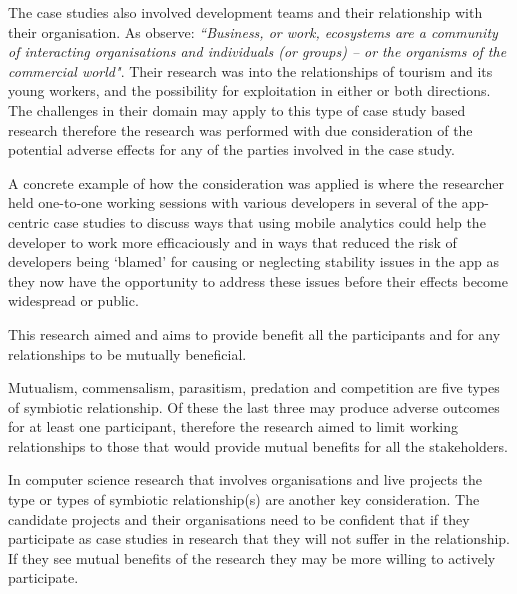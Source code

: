 The case studies also involved development teams and their relationship with their organisation. 
As \citet[p.2]{robinson2019_applying_endosymbiosis_theory_tourism_and_its_young_workers} observe: \emph{``Business, or work, ecosystems are a community of interacting organisations and individuals (or groups) – or the organisms of the commercial world"}. Their research was into the relationships of tourism and its young workers, and the possibility for exploitation in either or both directions. The challenges in their domain may apply to this type of case study based research therefore the research was performed with due consideration of the potential adverse effects for any of the parties involved in the case study. 

A concrete example of how the consideration was applied is where the researcher held one-to-one working sessions with various developers in several of the app-centric case studies to discuss ways that using mobile analytics could help the developer to work more efficaciously and in ways that reduced the risk of developers being `blamed' for causing or neglecting stability issues in the app as they now have the opportunity to address these issues before their effects become widespread or public.


This research aimed and aims to provide benefit all the participants and for any relationships to be mutually beneficial.

Mutualism, commensalism, parasitism, predation and competition are five types of symbiotic relationship. %
Of these the last three may produce adverse outcomes for at least one participant, therefore the research aimed to limit working relationships to those that would provide mutual benefits for all the stakeholders.

In computer science research that involves organisations and live projects the type or types of symbiotic relationship(s) are another key consideration. The candidate projects and their organisations need to be confident that if they participate as case studies in research that they will not suffer in the relationship. If they see mutual benefits of the research they may be more willing to actively participate. 


